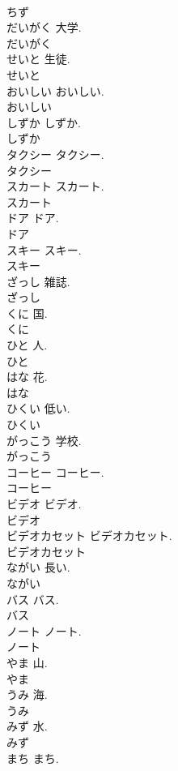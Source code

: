 \documentclass[8pt]{extreport}
\begin{document}
\begin{CJK}{UTF8}{min}
\\	ちず
\\	だいがく		大学.	
\\	だいがく
\\	せいと		生徒.	
\\	せいと
\\	おいしい		おいしい.	
\\	おいしい
\\	しずか		しずか.	
\\	しずか
\\	タクシー		タクシー.	
\\	タクシー
\\	スカート		スカート.	
\\	スカート
\\	ドア		ドア.	
\\	ドア
\\	スキー		スキー.	
\\	スキー
\\	ざっし		雑誌.	
\\	ざっし
\\	くに		国.	
\\	くに
\\	ひと		人.	
\\	ひと
\\	はな		花.	
\\	はな
\\	ひくい		低い.	
\\	ひくい
\\	がっこう		学校.	
\\	がっこう
\\	コーヒー		コーヒー.	
\\	コーヒー
\\	ビデオ		ビデオ.	
\\	ビデオ
\\	ビデオカセット		ビデオカセット.	
\\	ビデオカセット
\\	ながい		長い.	
\\	ながい
\\	バス		バス.	
\\	バス
\\	ノート		ノート.	
\\	ノート
\\	やま		山.	
\\	やま
\\	うみ		海.	
\\	うみ
\\	みず		水.	
\\	みず
\\	まち		まち.	

\end{CJK}
\end{document}
